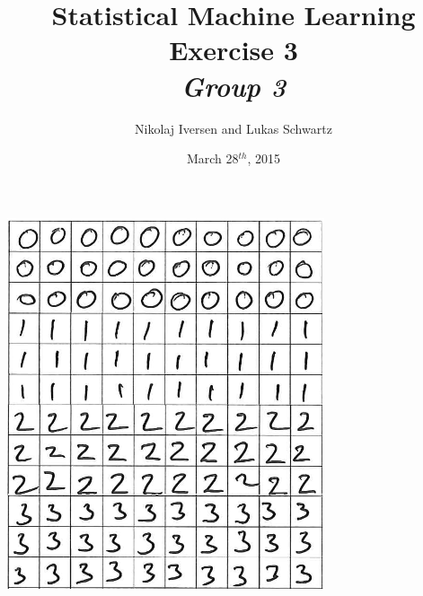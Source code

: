 \documentclass[12pt,a4paper]{article}
\begin{document}
\title{Statistical Machine Learning\\Exercise 3\\{\large\emph{Group 3}}}
\author{Nikolaj Iversen and Lukas Schwartz}
\date{March 28$^{th}$, 2015}
\maketitle

\vfill
\begin{center}
\includegraphics[width=0.7\textwidth]{graphics/digit_example}
\end{center}

\newpage

\tableofcontents
\listoffigures
\listoftables

\newpage



% 


% 

% 

%
%
%
%
%
%
%
%
\end{document}
